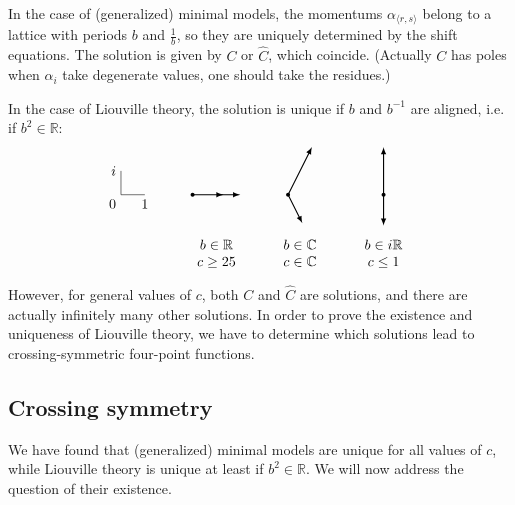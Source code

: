 \documentclass[12pt, a4paper]{article}
\theoremstyle{break}
\begin{document}
In the case of (generalized) minimal models, the momentums $\alpha_{\langle r,s\rangle}$ belong to a lattice with periods $b$ and $\frac{1}{b}$, so they are uniquely determined by the shift equations. The solution is given by $C$ or $\hat C$, which coincide. (Actually $C$ has poles when $\alpha_i$ take degenerate values, one should take the residues.)

In the case of Liouville theory, the solution is unique if $b$ and $b^{-1}$ are aligned, i.e. if $b^2\in\mathbb{R}$:
\begin{equation}
 \begin{tikzpicture}[baseline=(current  bounding  box.center), scale = .6]
\draw (0, 2) node[left]{$i$} -- (0, 1) node[below left] {$0$} -- (1, 1) node[below] {$1$};
\draw [thick, latex-latex] (11,3) -- (11,1) node[fill, circle, minimum size = 1mm, inner sep = 0]{} -- (11,-.3);
\draw [thick, latex-latex] (8,3) -- (7,1) node[fill, circle, minimum size = 1mm, inner sep = 0]{}-- (7.6,-.2);
\draw [thick, latex-latex] (5,1) -- (3,1) node[fill, circle, minimum size = 1mm, inner sep = 0]{} -- (4.3,1) ;
\node at (4, -1.5){$\begin{array}{c} b\in \mathbb{R} \\ c\geq 25 \end{array}$};
\node at (7.5, -1.5){$\begin{array}{c} b\in \mathbb{C} \\ c\in\mathbb{C} \end{array}$};
\node at (11, -1.5){$\begin{array}{c} b\in i\mathbb{R} \\ c\leq 1 \end{array}$};
 \end{tikzpicture}
\end{equation}
However, for general values of $c$, both $C$ and $\hat C$ are solutions, and there are actually infinitely many other solutions. In order to prove the existence and uniqueness of Liouville theory, we have to determine which solutions lead to crossing-symmetric four-point functions.


\subsection{Crossing symmetry}

We have found that (generalized) minimal models are unique for all values of $c$, while Liouville theory is unique at least if $b^2\in\mathbb{R}$. We will now address the question of their existence. 
\end{document}
